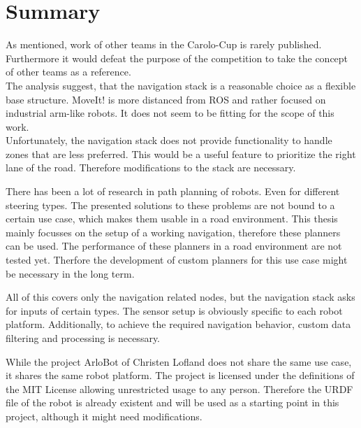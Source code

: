 \section{Summary}
As mentioned, work of other teams in the Carolo-Cup is rarely published. Furthermore it would defeat the purpose of the competition to take the concept of other teams as a reference.\\

The analysis suggest, that the navigation stack is a reasonable choice as a flexible base structure. MoveIt! is more distanced from ROS and rather focused on industrial arm-like robots. It does not seem to be fitting for the scope of this work.\\

Unfortunately, the navigation stack does not provide functionality to handle zones that are less preferred. This would be a useful feature to prioritize the right lane of the road. Therefore modifications to the stack are necessary.


There has been a lot of research in path planning of robots. Even for different steering types. The presented solutions to these problems are not bound to a certain use case, which makes them usable in a road environment. 
This thesis mainly focusses on the setup of a working navigation, therefore these planners can be used. The performance of these planners in a road environment are not tested yet. Therfore the development of custom planners for this use case might be necessary in the long term.

All of this covers only the navigation related nodes, but the navigation stack asks for inputs of certain types. The sensor setup is obviously specific to each robot platform. Additionally, to achieve the required navigation behavior, custom data filtering and processing is necessary.


While the project ArloBot of Christen Lofland does not share the same use case, it shares the same robot platform. The project is licensed under the definitions of the MIT License allowing unrestricted usage to any person. Therefore the URDF file of the robot is already existent and will be used as a starting point in this project, although it might need modifications.












